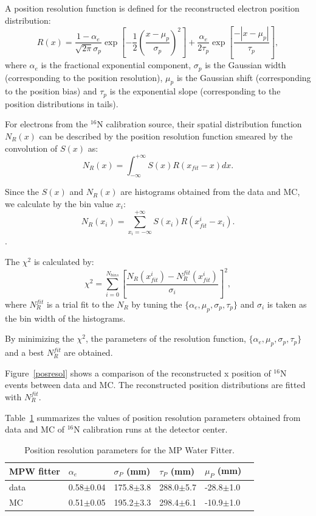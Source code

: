 A position resolution function is defined for the reconstructed electron position distribution\cite{boulay2004direct}:
\[
R(x)=\frac{1-\alpha_e}{\sqrt{2\pi}\sigma_p}\exp{[-\frac{1}{2}(\frac{x-\mu_p}{\sigma_p})^2]+\frac{\alpha_e}{2\tau_p}\exp{[\frac{-|x-\mu_p|}{\tau_p}]}},
\]
where $\alpha_e$ is the fractional exponential component, $\sigma_p$ is
the Gaussian width (corresponding to the position resolution), $\mu_p$ is the Gaussian shift  (corresponding to the position bias) and $\tau_p$ is the exponential slope (corresponding to the position distributions in tails).

For electrons from the $^{16}$N calibration source, their spatial distribution function $N_{R}(x)$ can be described by the position resolution function smeared by the convolution of $S(x)$ as\cite{boulay2004direct}:
\[
N_{R}(x)=\int^{+\infty}_{-\infty} S(x)R(x_{fit}-x)dx.
\]

Since the $S(x)$ and $N_{R}(x)$ are histograms obtained from the data and MC, we calculate by the bin value $x_i$: 
\[N_R(x_i)=\sum_{x_i=-\infty}^{+\infty}S(x_i)R(x_{fit}^i-x_i).\].

The $\chi^2$ is calculated by:
\[
\chi^2=\sum^{N_{bins}}_{i=0}[\frac{N_R(x_{fit}^i)-N_R^{fit}(x_{fit}^i)}{\sigma_i}]^2,
\]
where $N_R^{fit}$ is a trial fit to the $N_R$ by tuning the $\{\alpha_e,\mu_p,\sigma_p,\tau_p\}$ and $\sigma_i$ is taken as the bin width of the histograms.

By minimizing the $\chi^2$, the parameters of the resolution function, $\{\alpha_e,\mu_p,\sigma_p,\tau_p\}$ and a best $N_R^{fit}$ are obtained.

Figure~\ref{posresol} shows a comparison of the reconstructed x position of {$^{16}$}N events between data and MC. The reconstructed position distributions are fitted with $N_R^{fit}$.


Table~\ref{table_posresol} summarizes the values of position resolution parameters obtained from data and MC of {$^{16}$}N calibration runs at the detector center.
\vspace{1mm}
\begin{table}[ht]
	\centering
	\caption{Position resolution parameters for the MP Water Fitter.}
	\label{table_posresol}
	\begin{tabular}{|p{2.5cm}|p{2.2cm}|p{2.1cm}|p{2.1cm}|p{2.1cm}| p{2.1cm}|}
		\hline
		MPW fitter & $\alpha_e$ & $\sigma_P$ (mm) &  $\tau_P$ (mm)& $\mu_P$ (mm)\\
		\hline 
		data& 0.58$\pm$0.04 & 175.8$\pm$3.8 & 288.0$\pm$5.7 & -28.8$\pm$1.0\\	
		\hline 
		MC & 0.51$\pm$0.05 & 195.2$\pm$3.3 & 298.4$\pm$6.1 & -10.9$\pm$1.0\\
		\hline
	\end{tabular}
\end{table}
\vspace{1mm}

